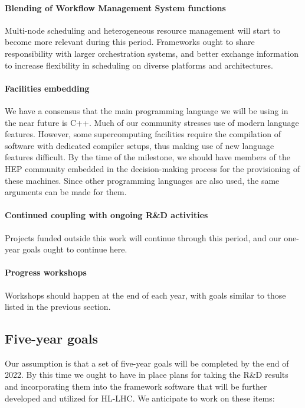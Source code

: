 \documentclass[12pt,a4paper]{article}
\begin{document}
\paragraph{Blending of Workflow Management System functions}
Multi-node scheduling and heterogeneous resource management will start
to become more relevant during this period. Frameworks ought to share
responsibility with larger orchestration systems, and better exchange
information to increase flexibility in scheduling on diverse platforms
and architectures.

\paragraph{Facilities embedding} We have a consensus that the main
programming language we will be using in the near future is C++.  Much
of our community stresses use of modern language features. However,
some supercomputing facilities require the compilation of software
with dedicated compiler setups, thus making use of new language
features difficult. By the time of the milestone, we should have
members of the HEP community embedded in the decision-making process
for the provisioning of these machines. Since other programming
languages are also used, the same arguments can be made for them.

\paragraph{Continued coupling with ongoing R\&D activities} Projects
funded outside this work will continue through this period, and our
one-year goals ought to continue here.

\paragraph{Progress workshops} Workshops should happen at the end of
each year, with goals similar to those listed in the previous section.

\subsection{Five-year goals}
\label{sec:five-year-goals}

Our assumption is that a set of five-year goals will be completed by
the end of 2022. By this time we ought to have in place plans for
taking the R\&D results and incorporating them into the framework
software that will be further developed and utilized for HL-LHC. We
anticipate to work on these items:
\end{document}
